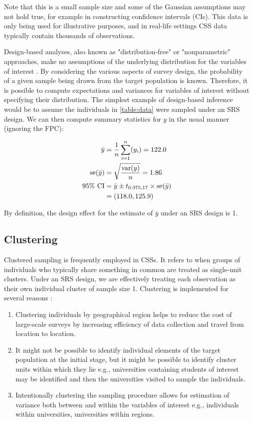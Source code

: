 Note that this is a small sample size and some of the Gaussian assumptions may not hold true, for example in constructing confidence intervals (CIs). This data is only being used for illustrative purposes, and in real-life settings CSS data typically contain thousands of observations. 

Design-based analyses, also known as "distribution-free" or "nonparametric" approaches, make no assumptions of the underlying distribution for the variables of interest \citep{heeringa2017}. By considering the various aspects of survey design, the probability of a given sample being drawn from the target population is known. Therefore, it is possible to compute expectations and variances for variables of interest without specifying their distribution. The simplest example of design-based inference would be to assume the individuals in \autoref{table:data} were sampled under an SRS design. We can then compute summary statistics for $y$ in the usual manner (ignoring the FPC):

\begin{align}
\label{eq:srs-stats}
\bar{y}					&=	\frac{1}{n} \sum_{i = 1}^{n} (y_i) 					=	122.0			\\
\notag
\text{se}(\bar{y})			&=	\sqrt{ \frac{ \text{var}(y) }{ n } }						=	1.86			\\
\notag
95\%\text{ CI}				&=	\bar{y} \pm t_{0.975, 17} \times \text{se}(\bar{y})							\\
\notag
						&=	(118.0, 125.9)
\end{align}

By definition, the design effect for the estimate of $\bar{y}$ under an SRS design is 1.

\subsection{Clustering}

Clustered sampling is frequently employed in CSSs. It refers to when groups of individuals who typically share something in common are treated as single-unit clusters. Under an SRS design, we are effectively treating each observation as their own individual cluster of sample size 1. Clustering is implemented for several reasons \citep{heeringa2017}:

\begin{enumerate}
\item Clustering individuals by geographical region helps to reduce the cost of large-scale surveys by increasing efficiency of data collection and travel from location to location.
\item It might not be possible to identify individual elements of the target population at the initial stage, but it might be possible to identify cluster units within which they lie e.g., universities containing students of interest may be identified and then the universities visited to sample the individuals.
\item Intentionally clustering the sampling procedure allows for estimation of variance both between and within the variables of interest e.g., individuals within universities, universities within regions.
\end{enumerate}

